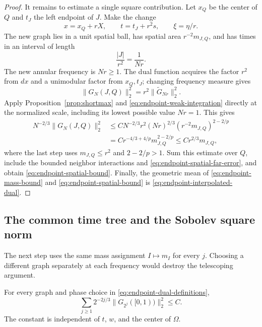 \begin{proof}
It remains to estimate a single square contribution.  Let $x_Q$ be the
center of $Q$ and $t_J$ the left endpoint of $J$.  Make the change
\[
 x=x_Q+rX,\qquad t=t_J+r^2s,\qquad \xi=\eta/r.
\]
The new graph lies in a unit spatial ball, has spatial area
$r^{-2}m_{J,Q}$, and has times in an interval of length
\[
 \frac{|J|}{r^2}=\frac1{Nr}.
\]
The new annular frequency is $Nr\ge1$.  The dual function acquires the
factor $r^2$ from $dx$ and a unimodular factor from $x_Q,t_J$; changing
frequency measure gives
\[
 \|G_N(J,Q)\|_2^2=r^2\|\widetilde G_{Nr}\|_2^2.
\]
Apply Proposition~\ref{prop:shortmax} and
\eqref{eq:endpoint-weak-integration} directly at the normalized scale,
including its lowest possible value $Nr=1$.  This gives
\begin{align*}
 N^{-2/3}\|G_N(J,Q)\|_2^2
 &\le C N^{-2/3}r^2(Nr)^{2/3}
                     (r^{-2}m_{J,Q})^{2-2/p}\\
 &=C r^{-4/3+4/p}m_{J,Q}^{2-2/p}
 \le C r^{2/3}m_{J,Q},
\end{align*}
where the last step uses $m_{J,Q}\le r^2$ and $2-2/p>1$.
Sum this estimate over $Q$, include the bounded neighbor interactions
and \eqref{eq:endpoint-spatial-far-error}, and obtain
\eqref{eq:endpoint-spatial-bound}.  Finally, the geometric mean of
\eqref{eq:endpoint-mass-bound} and \eqref{eq:endpoint-spatial-bound} is
\eqref{eq:endpoint-interpolated-dual}.
\end{proof}

\subsection{The common time tree and the Sobolev square norm}

The next step uses the same mass assignment $I\mapsto m_I$ for every
$j$.  Choosing a different graph separately at each frequency would
destroy the telescoping argument.

\begin{lemma}
\label{lem:endpoint-square-sum}
For every graph and phase choice in
\eqref{eq:endpoint-dual-definitions},
\begin{equation}
 \sum_{j\ge1}2^{-2j/3}\|G_{2^j}([0,1))\|_2^2\le C.
 \label{eq:endpoint-square-sum}
\end{equation}
The constant is independent of $t$, $w$, and the center of $\Omega$.
\end{lemma}

